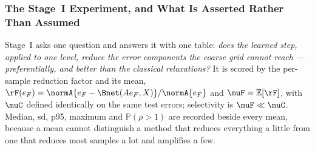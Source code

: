 \frametitle{The Stage~I Experiment, and What Is Asserted Rather Than Assumed}
\footnotesize

Stage~I asks one question and answers it with one table: \emph{does the learned step,
applied to one level, reduce the error components the coarse grid cannot reach ---
preferentially, and better than the classical relaxations?} It is scored by the
per-sample reduction factor and its mean, $\rF(e_F)=\normA{e_F-\Bnet(Ae_F,X)}/\normA{e_F}$
and $\muF=\mathbb{E}[\rF]$, with $\muC$ defined identically on the same test errors;
selectivity is $\muF\ll\muC$. Median, sd, p95, maximum and $\mathbb{P}(\rho>1)$ are
recorded beside every mean, because a mean cannot distinguish a method that reduces
everything a little from one that reduces most samples a lot and amplifies a few.

\vspace{1mm}
